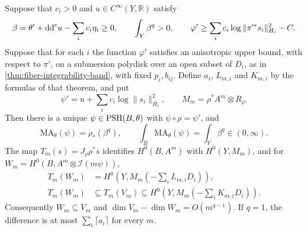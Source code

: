\begin{theorem}\label{thm:modified-base-fiber-band}
Suppose that $c_i>0$ and $u\in C^\infty(Y,\mathbb R)$ satisfy
\[
 \beta=\theta'+\mathrm{dd}^{\mathrm{c}} u-\sum_i c_i\eta_i\geq0,
 \qquad\int_Y\beta^q>0,
 \qquad \varphi'\geq\sum_i c_i\log\|\pi'^*s_i\|_{H_i}^2-C.
\]
Suppose that for each $i$ the function $\varphi'$ satisfies an anisotropic upper bound, with respect to $\pi'$, on a submersion polydisk over an open subset of $D_i$, as in \cref{thm:fiber-integrability-band}, with fixed $p_i,b_{ij}$. Define $a_i$, $L_{m,i}$ and $K_{m,i}$ by the formulas of that theorem, and put
\[
 \psi'=u+\sum_i c_i\log\|s_i\|_{H_i}^2,
 \qquad M_m=\rho^*A^m\otimes R_\rho.
\]
Then there is a unique $\psi\in\mathrm{PSH}(B,\theta)$ with $\psi\circ\rho=\psi'$, and
\[
 \mathrm{MA}_\theta(\psi)=\rho_*(\beta^q),\qquad
 \int_B\mathrm{MA}_\theta(\psi)=\int_Y\beta^q\in(0,\infty).
\]
The map $T_m(s)=J_\rho\rho^*s$ identifies $H^0(B,A^m)$ with $H^0(Y,M_m)$, and for $W_m=H^0(B,A^m\otimes\mathcal I(m\psi))$,
\[
 \begin{split}
 T_m(W_m)&=H^0\left(Y,M_m\left(-\sum_iL_{m,i}D_i\right)\right),\\
 T_m(W_m)&\subseteq T_m(V_m)
       \subseteq H^0\left(Y,M_m\left(-\sum_iK_{m,i}D_i\right)\right).
 \end{split}
\]
Consequently $W_m\subseteq V_m$ and $\dim V_m-\dim W_m=O(m^{q-1})$. If $q=1$, the difference is at most $\sum_i\lceil a_i\rceil$ for every $m$.
\end{theorem}
